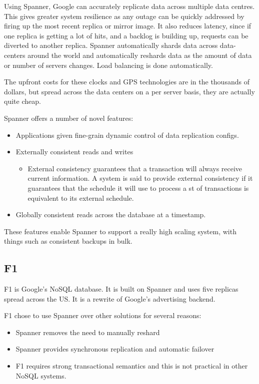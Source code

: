 \documentclass[11pt,a4paper,titlepage,dvipsnames,cmyk]{scrartcl}
\begin{document}
Using Spanner, Google can accurately replicate data across multiple data centres. This gives greater system resilience as any outage can be quickly addressed by firing up the most recent replica or mirror image. It also reduces latency, since if one replica is getting a lot of hits, and a backlog is building up, requests can be diverted to another replica. Spanner automatically shards data across data-centers around the world and automatically reshards data as the amount of data or number of servers changes. Load balancing is done automatically.

The upfront costs for these clocks and GPS technologies are in the thousands of dollars, but spread across the data centers on a per server basis, they are actually quite cheap.

Spanner offers a number of novel features:
\begin{itemize}
    \item Applications given fine-grain dynamic control of data replication configs.
    \item Externally consistent reads and writes
    \begin{itemize}
        \item External consistency guarantees that a transaction will always receive current information. A system is said to provide external consistency if it guarantees that the schedule it will use to process a st of transactions is equivalent to its external schedule.
    \end{itemize}
    \item Globally consistent reads across the database at a timestamp.
\end{itemize}

These features enable Spanner to support a really high scaling system, with things such as consistent backups in bulk.

\subsection{F1}
F1 is Google's NoSQL database. It is built on Spanner and uses five replicas spread across the US. It is a rewrite of Google's advertising backend.

F1 chose to use Spanner over other solutions for several reasons:
\begin{itemize}
    \item Spanner removes the need to manually reshard
    \item Spanner provides synchronous replication and automatic failover
    \item F1 requires strong transactional semantics and this is not practical in other NoSQL systems.
\end{itemize}
\end{document}
